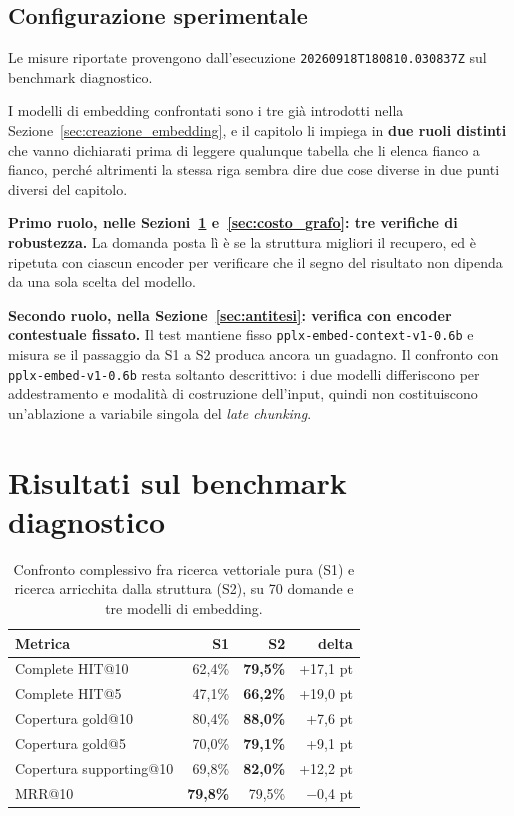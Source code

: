 \subsection{Configurazione sperimentale}

Le misure riportate provengono dall'esecuzione \texttt{20260918T180810.030837Z} sul benchmark diagnostico. 

I modelli di embedding confrontati sono i tre già introdotti nella Sezione~\ref{sec:creazione_embedding}, e il capitolo li impiega in \textbf{due ruoli distinti} che vanno dichiarati prima di leggere qualunque tabella che li elenca fianco a fianco, perché altrimenti la stessa riga sembra dire due cose diverse in due punti diversi del capitolo.

\textbf{Primo ruolo, nelle Sezioni~\ref{sec:risultato_principale} e~\ref{sec:costo_grafo}: tre verifiche di robustezza.} La domanda posta lì è se la struttura migliori il recupero, ed è ripetuta con ciascun encoder per verificare che il segno del risultato non dipenda da una sola scelta del modello.

\textbf{Secondo ruolo, nella Sezione~\ref{sec:antitesi}: verifica con encoder contestuale fissato.} Il test mantiene fisso \texttt{pplx-embed-context-v1-0.6b} e misura se il passaggio da S1 a S2 produca ancora un guadagno. Il confronto con \texttt{pplx-embed-v1-0.6b} resta soltanto descrittivo: i due modelli differiscono per addestramento e modalità di costruzione dell'input, quindi non costituiscono un'ablazione a variabile singola del \textit{late chunking}.


\section{Risultati sul benchmark diagnostico}
\label{sec:risultato_principale}

\begin{table}[H]
    \centering
    \renewcommand{\arraystretch}{1.2}
    \begin{tabular}{|l|r|r|r|}
        \hline
        \textbf{Metrica} & \textbf{S1} & \textbf{S2} & \textbf{delta} \\
        \hline
        Complete HIT@10 & 62,4\% & \textbf{79,5\%} & +17,1 pt \\
        Complete HIT@5 & 47,1\% & \textbf{66,2\%} & +19,0 pt \\
        Copertura gold@10 & 80,4\% & \textbf{88,0\%} & +7,6 pt \\
        Copertura gold@5 & 70,0\% & \textbf{79,1\%} & +9,1 pt \\
        Copertura supporting@10 & 69,8\% & \textbf{82,0\%} & +12,2 pt \\
        MRR@10 & \textbf{79,8\%} & 79,5\% & $-$0,4 pt \\
        \hline
    \end{tabular}
    \caption{Confronto complessivo fra ricerca vettoriale pura (S1) e ricerca arricchita dalla struttura (S2), su 70 domande e tre modelli di embedding.}
    \label{tab:risultato_principale}
\end{table}

